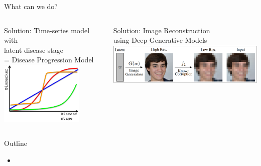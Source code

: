 \documentclass[8pt,xcolor=table]{beamer}
\begin{document}
\begin{frame}{What can we do?}
\begin{columns}[t]
\begin{column}{0.5\textwidth}
\begin{itemize}
\begin{itemize}
\end{itemize}
\end{itemize}

\vspace{2em}




\end{column}
\end{columns}


\begin{columns}[t]
\begin{column}{0.5\textwidth}
\centering

Solution: Time-series model with\\ latent disease stage\\
= Disease Progression Model\\
\includegraphics[height=3cm]{dpm_small}

\end{column}
\begin{column}{0.5\textwidth}
\centering

Solution: Image Reconstruction\\ using Deep Generative Models\\
\includegraphics[height=2cm, trim=6 6 6 6,clip]{brgm_diagram_small}

\end{column}
\end{columns}







\end{frame}


\begin{frame}{Outline}

\begin{itemize}
 \item 
\end{itemize}
 


\end{frame}
\end{document}
